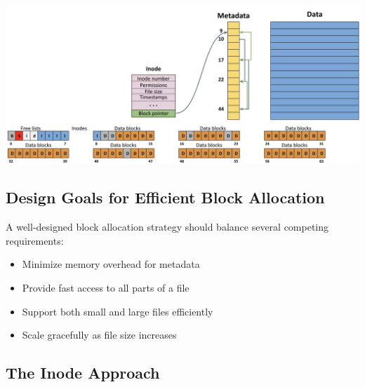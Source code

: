\begin{center}
  \includegraphics[width=1.05\textwidth]{chapters/L7/images/problem.png}
\end{center}
\newpage
\subsection{Design Goals for Efficient Block Allocation}

A well-designed block allocation strategy should balance several competing requirements:
\begin{itemize}
  \item Minimize memory overhead for metadata
  \item Provide fast access to all parts of a file
  \item Support both small and large files efficiently
  \item Scale gracefully as file size increases
\end{itemize}

\subsection{The Inode Approach}

